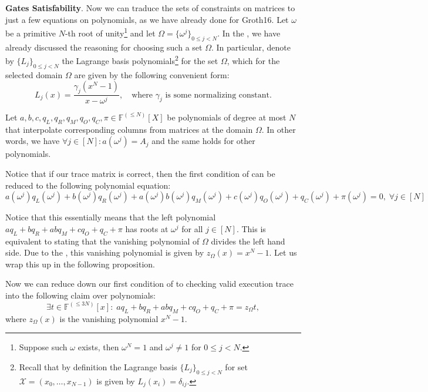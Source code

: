 \documentclass[../lecture-notes.tex]{subfiles}
\begin{document}
\textcolor{blue!80!black}{\textbf{Gates Satisfability}.} Now we can traduce the
sets of constraints on matrices to just a few equations on polynomials, as we
have already done for Groth16. Let $\omega$ be a primitive $N$-th root of
unity\footnote{Suppose such $\omega$ exists, then $\omega^N = 1$ and $\omega^j
\neq 1$ for $0 \le j < N$.} and let $\Omega = \{\omega^j\}_{0 \leq j < N}$. In
the , we have already discussed the reasoning for choosing
such a set $\Omega$. In particular, denote by $\{L_j\}_{0 \leq j < N}$ the
Lagrange basis polynomials\footnote{Recall that by definition the Lagrange basis
$\{L_j\}_{0 \leq j < N}$ for set $\mathcal{X}=(x_0,\dots,x_{N-1})$ is given by
$L_j(x_i) = \delta_{ij}$.} for the set $\Omega$, which for the selected domain
$\Omega$ are given by the following convenient form:
\begin{equation*}
    L_j(x) = \frac{\gamma_j(x^N - 1)}{x-\omega^j}, \quad \text{where $\gamma_j$ is some normalizing constant.}
\end{equation*}

Let $a, b, c, q_L, q_R, q_M, q_O, q_C, \pi \in \mathbb{F}^{(\leq N)}[X]$ be
polynomials of degree at most $N$ that interpolate corresponding columns from
matrices at the domain $\Omega$. In other words, we have \(\forall j \in [N]:
a(\omega^j) = A_j\) and the same holds for other polynomials.

Notice that if our trace matrix is correct, then the first condition of
 can be reduced to the following polynomial
equation:
\begin{equation*}
    a(\omega^j)q_L(\omega^j) + b(\omega^j)q_R(\omega^j) + a(\omega^j)b(\omega^j)q_M(\omega^j) + c(\omega^j)q_O(\omega^j) + q_C(\omega^j) + \pi(\omega^j) = 0, \; \forall j \in [N]
\end{equation*}

Notice that this essentially means that the left polynomial $aq_L + bq_R + abq_M
+ cq_O + q_C + \pi$ has roots at $\omega^j$ for all $j \in [N]$. This is
equivalent to stating that the vanishing polynomial of $\Omega$ divides the left
hand side. Due to the , this vanishing
polynomial is given by $z_{\Omega}(x) = x^N-1$.  Let us wrap this up in the
following proposition.

\begin{proposition}
    Now we can reduce down our first condition of 
    to checking valid execution trace into the following claim over polynomials:
    \[\exists t \in \mathbb{F}^{(\leq 3N)}[x]: \; aq_L + bq_R + abq_M + cq_O + q_C + \pi = z_{\Omega}t,\]
    where $z_{\Omega}(x)$ is the vanishing polynomial $x^N - 1$.
\end{proposition}
\end{document}
